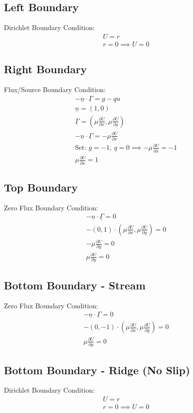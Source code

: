 \documentclass[letterpaper,landscape, 10pt]{article}
\renewcommand{\vec}[1]{\underline{#1}}
\newcommand{\pd}[2]{\frac{\partial #1}{\partial #2}}
\begin{document}
	\subsection{Left Boundary}
	Dirichlet Boundary Condition:
	\begin{gather*}
		U = r\\
		r = 0 \implies U = 0
	\end{gather*}
	\subsection{Right Boundary}
	Flux/Source Boundary Condition:
	\begin{gather*}
		-\vec{n}\cdot\vec{\Gamma} = g-qu\\
		\vec{n} = \left(1,0\right)\\
		\vec{\Gamma} = \left(\mu\pd{U}{x},\mu\pd{U}{y}\right)\\
		-\vec{n}\cdot\vec{\Gamma} = -\mu\pd{U}{x}\\
		\text{Set: }g = -1,\ q = 0 \implies -\mu\pd{U}{x} = -1\\
		\mu\pd{U}{x} = 1
	\end{gather*}
	\subsection{Top Boundary}
	Zero Flux Boundary Condition:
	\begin{gather*}
		-\vec{n}\cdot\vec{\Gamma} = 0\\
		-\left(0,1\right)\cdot\left(\mu\pd{U}{x},\mu\pd{U}{y}\right) = 0\\
		-\mu\pd{U}{y} = 0\\
		\mu\pd{U}{y} = 0
	\end{gather*}
	\subsection{Bottom Boundary - Stream}
	Zero Flux Boundary Condition:
	\begin{gather*}
		-\vec{n}\cdot\vec{\Gamma} = 0\\
		-\left(0,-1\right)\cdot\left(\mu\pd{U}{x},\mu\pd{U}{y}\right) = 0\\
		\mu\pd{U}{y} = 0
	\end{gather*}
	\subsection{Bottom Boundary - Ridge (No Slip)}
	Dirichlet Boundary Condition:
	\begin{gather*}
		U = r\\
		r = 0 \implies U = 0
	\end{gather*}
\end{document}
